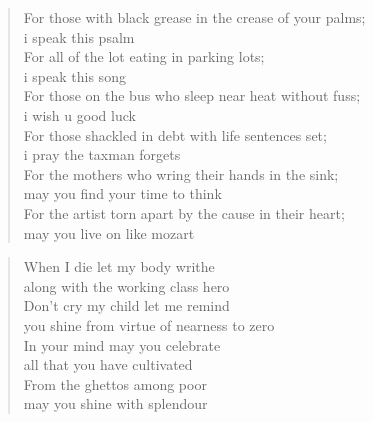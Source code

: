 \documentclass[12pt,a4paper]{article}
\begin{document}
\begin{verse}
For those with black grease in the crease of your palms; \\
i speak this psalm \\
For all of the lot eating  in parking lots; \\
i speak this song \\
For those on the bus who sleep near heat without fuss; \\
i wish u good luck \\
For those shackled in debt with life sentences set; \\
i pray the taxman forgets \\
For the mothers who wring their hands in the sink; \\
may you find your time to think \\
For the artist torn apart by the cause in their heart; \\
may you live on like mozart \\
\end{verse}
\begin{verse}
When I die let my body writhe \\
along with the working class hero \\
Don't cry my child let me remind \\
you shine from virtue of nearness to zero\\
In your mind may you celebrate \\
all that you have cultivated\\
From the ghettos among poor \\
may you shine with splendour \\
\end{verse}
\end{document}
